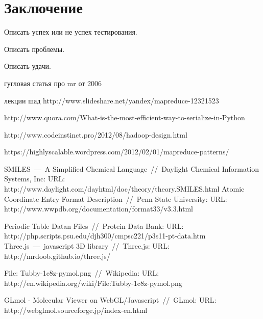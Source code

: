 \documentclass[12pt,a4paper,oneside]{extarticle}
\begin{document}
\clearpage

\section{Заключение}

    Описать успех или не успех тестирования. 

    Описать проблемы. 

    Описать удачи.
    
\clearpage


\begin{thebibliography}{0}
    гугловая статья про mr от 2006

    лекции шад http://www.slideshare.net/yandex/mapreduce-12321523

    http://www.quora.com/What-is-the-most-efficient-way-to-serialize-in-Python

    http://www.codeinstinct.pro/2012/08/hadoop-design.html

    https://highlyscalable.wordpress.com/2012/02/01/mapreduce-patterns/

         SMILES~---~A Simplified Chemical Language~//~Daylight Chemical Information Systems, Inc: URL: http://www.daylight.com/dayhtml/doc/theory/theory.SMILES.html
        Atomic Coordinate Entry Format Description~//~Penn State University: URL: http://www.wwpdb.org/documentation/format33/v3.3.html
        
        Periodic Table Datan Files~//~Protein Data Bank: URL: http://php.scripts.psu.edu/djh300/cmpsc221/p3s11-pt-data.htm
        Three.js~---~javascript 3D library~//~Three.js: URL: http://mrdoob.github.io/three.js/
        
       File: Tubby-1c8z-pymol.png~//~Wikipedia: URL: http://en.wikipedia.org/wiki/File:Tubby-1c8z-pymol.png
             
       GLmol - Molecular Viewer on WebGL/Javascript~//~GLmol: URL: http://webglmol.sourceforge.jp/index-en.html
        
\end{thebibliography}
\end{document}
